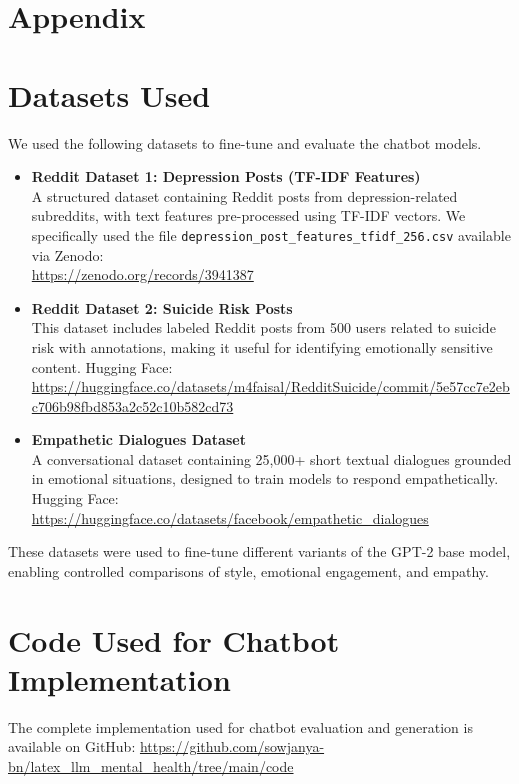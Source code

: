 \appendix

\section*{Appendix}

\section{Datasets Used}
\label{appendix:datasets}

We used the following datasets to fine-tune and evaluate the chatbot models.

\begin{itemize}
    \item \textbf{Reddit Dataset 1: Depression Posts (TF-IDF Features)} \\
    A structured dataset containing Reddit posts from depression-related subreddits, with text features pre-processed using TF-IDF vectors. We specifically used the file \texttt{depression\_post\_features\_tfidf\_256.csv} available via Zenodo: \\
    \url{https://zenodo.org/records/3941387}
    
    \item \textbf{Reddit Dataset 2: Suicide Risk Posts} \\
    This dataset includes labeled Reddit posts from 500 users related to suicide risk with annotations, making it useful for identifying emotionally sensitive content. Hugging Face: \\
    \url{https://huggingface.co/datasets/m4faisal/RedditSuicide/commit/5e57cc7e2ebc706b98fbd853a2c52c10b582cd73}
    
    \item \textbf{Empathetic Dialogues Dataset} \\
    A conversational dataset containing 25,000+ short textual dialogues grounded in emotional situations, designed to train models to respond empathetically. Hugging Face: \\
    \url{https://huggingface.co/datasets/facebook/empathetic_dialogues}
\end{itemize}

These datasets were used to fine-tune different variants of the GPT-2 base model, enabling controlled comparisons of style, emotional engagement, and empathy.


\section{Code Used for Chatbot Implementation}
\label{appendix:code}

The complete implementation used for chatbot evaluation and generation is available on GitHub: \url{https://github.com/sowjanya-bn/latex_llm_mental_health/tree/main/code}
